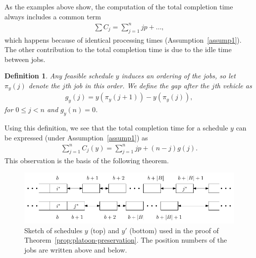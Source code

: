 \documentclass{article}
\theoremstyle{definition}
\theoremstyle{plain}
\newtheorem{define}{Definition}[section]
\begin{document}
As the examples above show, the computation of the total completion time always includes a common term
\begin{align*}
  \sum C_{j} = \sum_{j=1}^{n} jp + \dots ,
\end{align*}
which happens because of identical processing times
(Assumption~\ref{assump1}).
The other contribution to the total completion time is due to the idle time between jobs.

\begin{define}
  Any feasible schedule $y$ induces an ordering of the jobs, so let $\pi_{y}(j)$ denote the $j$th job in this order. We define the {\normalfont gap after the $j$th vehicle} as
  \begin{align}
    g_{y}(j) = y(\pi_{y}(j+1)) - y(\pi_{y}(j)) ,
  \end{align}
  for $0 \leq j < n$ and $g_{y}(n) = 0$.
\end{define}

Using this definition, we see that the total completion time for a schedule $y$ can be expressed (under Assumption~\ref{assump1}) as
\begin{align}
  \sum_{j=1}^{n} C_{j}(y) = \sum_{j=1} ^{n} jp + (n-j) g(j) .
\end{align}
This observation is the basis of the following theorem.

\begin{figure}
  \centering
  \includegraphics[width=1.00\textwidth]{figures/platoon-preservation-thm.pdf}
  \caption{Sketch of schedules $y$ (top) and $y'$ (bottom) used in the proof of
    Theorem~\ref{prop:platoon-preservation}. The position numbers of the jobs
    are written above and below.}
  \label{fig:platoon-preservation}
\end{figure}
\end{document}
